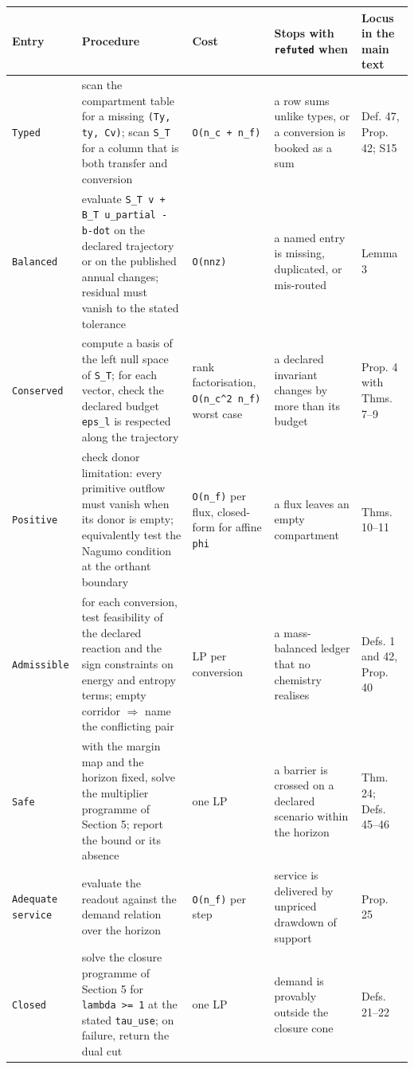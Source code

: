 \documentclass[11pt]{article}
\begin{document}
\begin{longtable}{@{}l|p{39mm}|p{39mm}|p{39mm}|l@{}}
\toprule
Entry & Procedure & Cost & Stops with \texttt{refuted} when & Locus in the main text \\
\midrule
\texttt{Typed} & scan the compartment table for a missing \texttt{(Ty, ty, Cv)}; scan \texttt{S\_T} for a column that is both transfer and conversion & \texttt{O(n\_c + n\_f)} & a row sums unlike types, or a conversion is booked as a sum & Def. 47, Prop. 42; S15 \\
\texttt{Balanced} & evaluate \texttt{S\_T v + B\_T u\_partial - b-dot} on the declared trajectory or on the published annual changes; residual must vanish to the stated tolerance & \texttt{O(nnz)} & a named entry is missing, duplicated, or mis-routed & Lemma 3 \\
\texttt{Conserved} & compute a basis of the left null space of \texttt{S\_T}; for each vector, check the declared budget \texttt{eps\_l} is respected along the trajectory & rank factorisation, \texttt{O(n\_c\textasciicircum{}2 n\_f)} worst case & a declared invariant changes by more than its budget & Prop. 4 with Thms. 7--9 \\
\texttt{Positive} & check donor limitation: every primitive outflow must vanish when its donor is empty; equivalently test the Nagumo condition at the orthant boundary & \texttt{O(n\_f)} per flux, closed-form for affine \texttt{phi} & a flux leaves an empty compartment & Thms. 10--11 \\
\texttt{Admissible} & for each conversion, test feasibility of the declared reaction and the sign constraints on energy and entropy terms; empty corridor \ensuremath{\Rightarrow} name the conflicting pair & LP per conversion & a mass-balanced ledger that no chemistry realises & Defs. 1 and 42, Prop. 40 \\
\texttt{Safe} & with the margin map and the horizon fixed, solve the multiplier programme of Section 5; report the bound or its absence & one LP & a barrier is crossed on a declared scenario within the horizon & Thm. 24; Defs. 45--46 \\
\texttt{Adequate service} & evaluate the readout against the demand relation over the horizon & \texttt{O(n\_f)} per step & service is delivered by unpriced drawdown of support & Prop. 25 \\
\texttt{Closed} & solve the closure programme of Section 5 for \texttt{lambda >= 1} at the stated \texttt{tau\_use}; on failure, return the dual cut & one LP & demand is provably outside the closure cone & Defs. 21--22 \\
\bottomrule
\end{longtable}
\end{document}
